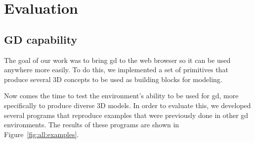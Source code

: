 
\chapter{Evaluation}
\label{chapter:evaluation}




\section{GD capability}
The goal of our work was to bring \gls{gd} to the web browser so it can be used anywhere more easily.
To do this, we implemented a set of primitives that produce several 3D concepts to be used as building blocks for modeling.

Now comes the time to test the environment's ability to be used for \gls{gd}, more specifically to produce diverse 3D models.
In order to evaluate this, we developed several programs that reproduce examples that were previously done in other \gls{gd} environments.
The results of these programs are shown in Figure~\ref{fig:all:examples}.

